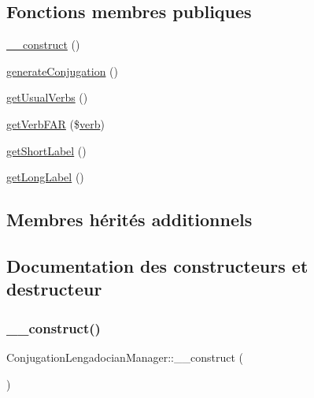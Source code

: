 \subsection*{Fonctions membres publiques}
\begin{DoxyCompactItemize}
\item 
\hyperlink{class_conjugation_lengadocian_manager_a309ea818cbfcd87265e60ccf467b2e17}{\+\_\+\+\_\+construct} ()
\item 
\hyperlink{class_conjugation_lengadocian_manager_aaa61dfc0043e13de40d77255494cba82}{generate\+Conjugation} ()
\item 
\hyperlink{class_conjugation_lengadocian_manager_a1ec18e3663eae35578b4f1967e4d981d}{get\+Usual\+Verbs} ()
\item 
\hyperlink{class_conjugation_lengadocian_manager_a5e9c807113463d8d0044e3ba13937fa1}{get\+Verb\+F\+AR} (\$\hyperlink{teibase_8php_aa8d8fadfcf4239c7aa288414da9d0ace}{verb})
\item 
\hyperlink{class_conjugation_lengadocian_manager_a87ad1195fe8eea002079c372843bb9fa}{get\+Short\+Label} ()
\item 
\hyperlink{class_conjugation_lengadocian_manager_ac14ff4edd45b3de2d303f2ac5fc94d91}{get\+Long\+Label} ()
\end{DoxyCompactItemize}
\subsection*{Membres hérités additionnels}


\subsection{Documentation des constructeurs et destructeur}
\hypertarget{class_conjugation_lengadocian_manager_a309ea818cbfcd87265e60ccf467b2e17}{}\label{class_conjugation_lengadocian_manager_a309ea818cbfcd87265e60ccf467b2e17} 
\subsubsection{\texorpdfstring{\+\_\+\+\_\+construct()}{\_\_construct()}}
{\footnotesize\ttfamily Conjugation\+Lengadocian\+Manager\+::\+\_\+\+\_\+construct (\begin{DoxyParamCaption}{ }\end{DoxyParamCaption})}



